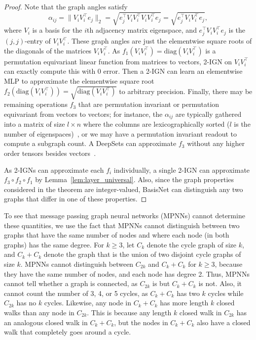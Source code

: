 \documentclass{article} \usepackage{iclr2023_conference,times}
\newcommand{\mrm}[1]{\mathrm{#1}}
\newcommand\norm[1]{\lVert#1\rVert}
\begin{document}
\begin{proof}
    Note that the graph angles satisfy 
    \begin{equation}
     \alpha_{ij} = \norm{V_i V_i^\top e_j}_2 = \sqrt{e_j^\top V_i V_i^\top V_i V_i^\top e_j} = \sqrt{e_j^\top V_i V_i^\top e_j},   
    \end{equation}
    where $V_i$ is a basis for the $i$th adjacency matrix eigenspace, and $e_j^\top V_i V_i^\top e_j$ is the $(j,j)$-entry of $V_i V_i^\top$. These graph angles are just the elementwise square roots of the diagonals of the matrices $V_i V_i^\top$. As $f_1(V_i V_i^\top) = \mrm{diag}(V_i V_i^\top)$ is a permutation equivariant linear function from matrices to vectors, 2-IGN on $V_i V_i^\top$ can exactly compute this with 0 error. Then a 2-IGN can learn an elementwise MLP to approximate the elementwise square root $f_2(\mrm{diag}(V_i V_i^\top)) = \sqrt{\mrm{diag}(V_i V_i^\top)}$ to arbitrary precision. Finally, there may be remaining operations $f_3$ that are permutation invariant or permutation equivariant from vectors to vectors; for instance, the $\alpha_{ij}$ are typically gathered into a matrix of size $l \times n$ where the columns are lexicographically sorted ($l$ is the number of eigenspaces)~\citep{cvetkovic1997eigenspaces}, or we may have a permutation invariant readout to compute a subgraph count. A DeepSets can approximate $f_3$ without any higher order tensors besides vectors~\citep{zaheer2017deep,segol2019universal}.

    As 2-IGNs can approximate each $f_i$ individually, a single 2-IGN can approximate $f_3 \circ f_2 \circ f_1$ by Lemma~\ref{lem:layer_universal}. 
    Also, since the graph properties considered in the theorem are integer-valued, BasisNet can distinguish any two graphs that differ in one of these properties.
\end{proof}

To see that message passing graph neural networks (MPNNs) cannot determine these quantities, we use the fact that MPNNs cannot distinguish between two graphs that have the same number of nodes and where each node (in both graphs) has the same degree. For $k \geq 3$, let $C_k$ denote the cycle graph of size $k$, and $C_k + C_k$ denote the graph that is the union of two disjoint cycle graphs of size $k$. MPNNs cannot distinguish between $C_{2k}$ and $C_k + C_k$ for $k \geq 3$, because they have the same number of nodes, and each node has degree 2. Thus, MPNNs cannot tell whether a graph is connected, as $C_{2k}$ is but $C_k + C_k$ is not. Also, it cannot count the number of 3, 4, or 5 cycles, as $C_k + C_k$ has two $k$ cycles while $C_{2k}$ has no $k$ cycles. Likewise, any node in $C_k + C_k$ has more length $k$ closed walks than any node in $C_{2k}$. This is because any length $k$ closed walk in $C_{2k}$ has an analogous closed walk in $C_k + C_k$, but the nodes in $C_k + C_k$ also have a closed walk that completely goes around a cycle.
\end{document}
